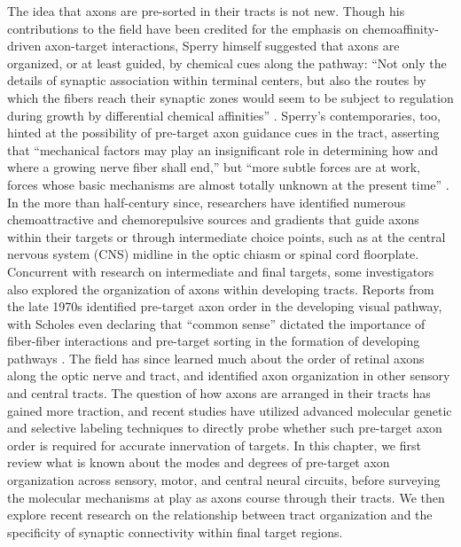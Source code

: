 The idea that axons are pre-sorted in their tracts is not new. 
Though his contributions to the field have been credited for the emphasis on chemoaffinity-driven axon-target interactions, Sperry himself suggested that axons are organized, or at least guided, by chemical cues along the pathway: “Not only the details of synaptic association within terminal centers, but also the routes by which the fibers reach their synaptic zones would seem to be subject to regulation during growth by differential chemical affinities” \cite{attardi1963preferential}. 
Sperry’s contemporaries, too, hinted at the possibility of pre-target axon guidance cues in the tract, asserting that “mechanical factors may play an insignificant role in determining how and where a growing nerve fiber shall end,” but “more subtle forces are at work, forces whose basic mechanisms are almost totally unknown at the present time” \cite{barnard1956study}. 
In the more than half-century since, researchers have identified numerous chemoattractive and chemorepulsive sources and gradients that guide axons within their targets or through intermediate choice points, such as at the central nervous system (CNS) midline in the optic chiasm or spinal cord floorplate. %
Concurrent with research on intermediate and final targets, some investigators also explored the organization of axons within developing tracts. 
Reports from the late 1970s identified pre-target axon order in the developing visual pathway, with Scholes even declaring that “common sense” dictated the importance of fiber-fiber interactions and pre-target sorting in the formation of developing pathways \cite{cook1977multiple, scholes1979nerve}. 
The field has since learned much about the order of retinal axons along the optic nerve and tract, and identified axon organization in other sensory and central tracts. %
The question of how axons are arranged in their tracts has gained more traction, and recent studies have utilized advanced molecular genetic and selective labeling techniques to directly probe whether such pre-target axon order is required for accurate innervation of targets. 
In this chapter, we first review what is known about the modes and degrees of pre-target axon organization across sensory, motor, and central neural circuits, before surveying the molecular mechanisms at play as axons course through their tracts. 
We then explore recent research on the relationship between tract organization and the specificity of synaptic connectivity within final target regions.